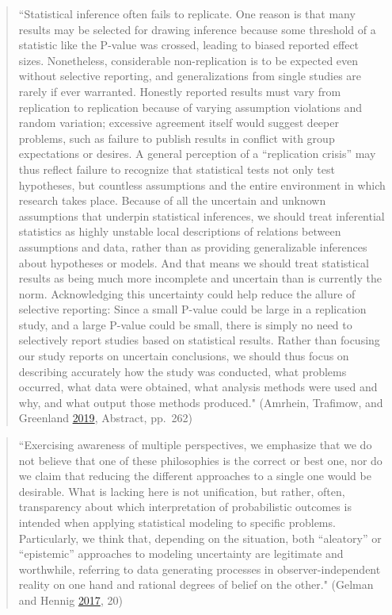 \documentclass[
]{book}
\begin{document}
\begin{quote}
``Statistical inference often fails to replicate. One reason is that many results may be selected for drawing inference because some threshold of a statistic like the P-value was crossed, leading to biased reported effect sizes. Nonetheless, considerable non-replication is to be expected even without selective reporting, and generalizations from single studies are rarely if ever warranted. Honestly reported results must vary from replication to replication because of varying assumption violations and random variation; excessive agreement itself would suggest deeper problems, such as failure to publish results in conflict with group expectations or desires. A general perception of a ``replication crisis'' may thus reflect failure to recognize that statistical tests not only test hypotheses, but countless assumptions and the entire environment in which research takes place. Because of all the uncertain and unknown assumptions that underpin statistical inferences, we should treat inferential statistics as highly unstable local descriptions of relations between assumptions and data, rather than as providing generalizable inferences about hypotheses or models. And that means we should treat statistical results as being much more incomplete and uncertain than is currently the norm. Acknowledging this uncertainty could help reduce the allure of selective reporting: Since a small P-value could be large in a replication study, and a large P-value could be small, there is simply no need to selectively report studies based on statistical results. Rather than focusing our study reports on uncertain conclusions, we should thus focus on describing accurately how the study was conducted, what problems occurred, what data were obtained, what analysis methods were used and why, and what output those methods produced." (Amrhein, Trafimow, and Greenland \protect\hyperlink{ref-amrheinInferentialStatisticsDescriptive2019}{2019}, Abstract, pp.~262)
\end{quote}

\begin{quote}
``Exercising awareness of multiple perspectives, we emphasize that we do not believe that one of these philosophies is the correct or best one, nor do we claim that reducing the different approaches to a single one would be desirable. What is lacking here is not unification, but rather, often, transparency about which interpretation of probabilistic outcomes is intended when applying statistical modeling to specific problems. Particularly, we think that, depending on the situation, both ``aleatory'' or ``epistemic'' approaches to modeling uncertainty are legitimate and worthwhile, referring to data generating processes in observer-independent reality on one hand and rational degrees of belief on the other." (Gelman and Hennig \protect\hyperlink{ref-gelmanSubjectiveObjectiveStatistics2017}{2017}, 20)
\end{quote}
\end{document}
